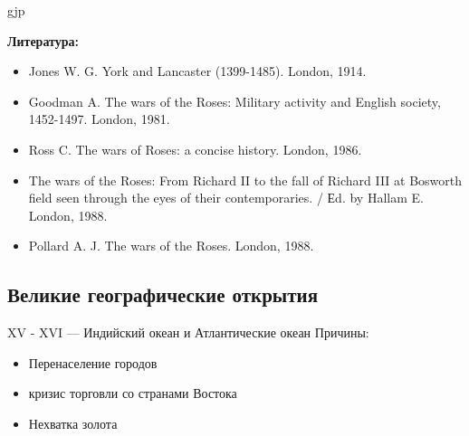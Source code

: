 gjp	 \documentclass[12pt,a4paper]{article}
\begin{document}
\textbf{Литература:}
\begin{itemize}
	\item Jones W. G. York and Lancaster (1399-1485). London, 1914.

	\item Goodman A. The wars of the Roses: Military activity and English society, 1452-1497. London, 1981.

	\item Ross C. The wars of Roses: a concise history. London, 1986.

	\item The wars of the Roses: From Richard II to the fall of Richard III at Bosworth field seen through the eyes of their contemporaries. / Еd. by Hallam E. London, 1988.

	\item Pollard A. J. The wars of the Roses. London, 1988.
\end{itemize}
\subsection{Великие географические открытия}
XV - XVI --- Индийский океан и Атлантические океан 
Причины:
\begin{itemize}
	\item Перенаселение городов
	\item кризис торговли со странами Востока
	\item Нехватка золота
\end{itemize}
\end{document}
